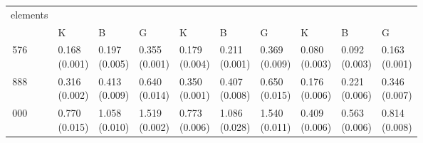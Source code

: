 \begin{table}[H]\centering\begin{tabular}{>{\centering\arraybackslash}m{1.2cm}|>{\centering\arraybackslash}m{1.25cm}>{\centering\arraybackslash}m{1.25cm}>{\centering\arraybackslash}m{1.25cm}|>{\centering\arraybackslash}m{1.25cm}>{\centering\arraybackslash}m{1.25cm}>{\centering\arraybackslash}m{1.25cm}|>{\centering\arraybackslash}m{1.25cm}>{\centering\arraybackslash}m{1.25cm}>{\centering\arraybackslash}m{1.25cm}}
\toprule
elements & \multicolumn{3}{|c}{gravity} & \multicolumn{3}{|c}{traction} & \multicolumn{3}{|c}{compression} \\
 & K & B & G & K & B & G & K & B & G \\
\midrule
24\,576 & \makecell{0.168\\[-4pt](0.001)} & \makecell{0.197\\[-4pt](0.005)} & \makecell{0.355\\[-4pt](0.001)} & \makecell{0.179\\[-4pt](0.004)} & \makecell{0.211\\[-4pt](0.001)} & \makecell{0.369\\[-4pt](0.009)} & \makecell{0.080\\[-4pt](0.003)} & \makecell{0.092\\[-4pt](0.003)} & \makecell{0.163\\[-4pt](0.001)} \\
63\,888 & \makecell{0.316\\[-4pt](0.002)} & \makecell{0.413\\[-4pt](0.009)} & \makecell{0.640\\[-4pt](0.014)} & \makecell{0.350\\[-4pt](0.001)} & \makecell{0.407\\[-4pt](0.008)} & \makecell{0.650\\[-4pt](0.015)} & \makecell{0.176\\[-4pt](0.006)} & \makecell{0.221\\[-4pt](0.006)} & \makecell{0.346\\[-4pt](0.007)} \\
162\,000 & \makecell{0.770\\[-4pt](0.015)} & \makecell{1.058\\[-4pt](0.010)} & \makecell{1.519\\[-4pt](0.002)} & \makecell{0.773\\[-4pt](0.006)} & \makecell{1.086\\[-4pt](0.028)} & \makecell{1.540\\[-4pt](0.011)} & \makecell{0.409\\[-4pt](0.006)} & \makecell{0.563\\[-4pt](0.006)} & \makecell{0.814\\[-4pt](0.008)} \\

\end{tabular}
\end{table}
